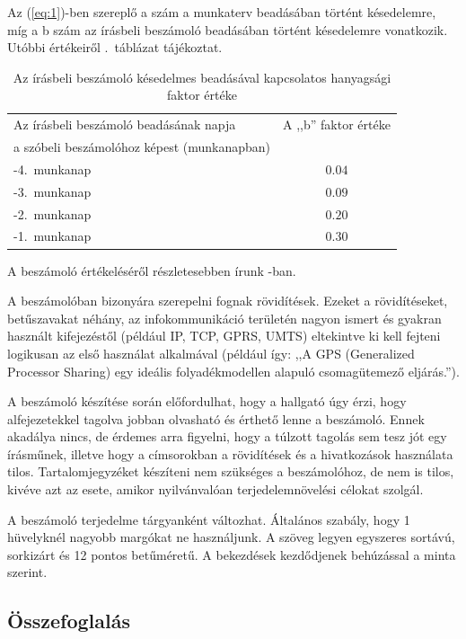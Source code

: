 \documentclass[a4paper,oneside]{article}
\begin{document}
Az (\ref{eq:1})-ben szereplő a szám a munkaterv beadásában történt
késedelemre, míg a b szám az írásbeli beszámoló beadásában történt
késedelemre vonatkozik.  Utóbbi értékeiről
.~táblázat tájékoztat.

\begin{table}
  \centering
    \begin{tabular}{|l|c|}
      \hline
      Az írásbeli beszámoló beadásának napja     & A ,,b'' faktor értéke \\
      a szóbeli beszámolóhoz képest (munkanapban) & ~ \\ \hline          
      -4.~munkanap & $0.04$ \\ \hline 
      -3.~munkanap & $0.09$ \\ \hline 
      -2.~munkanap & $0.20$ \\ \hline 
      -1.~munkanap & $0.30$ \\ \hline
      \end{tabular}
    \caption{Az írásbeli beszámoló késedelmes beadásával kapcsolatos hanyagsági faktor értéke}
  \label{tab:hanyagsagi}
\end{table}

A beszámoló értékeléséről részletesebben írunk \cite{web}-ban.

A beszámolóban bizonyára szerepelni fognak rövidítések. Ezeket a
rövidítéseket, betűszavakat néhány, az infokommunikáció területén
nagyon ismert és gyakran használt kifejezéstől (például IP, TCP, GPRS,
UMTS) eltekintve ki kell fejteni logikusan az első használat
alkalmával (például így: ,,A GPS (Generalized Processor Sharing) egy
ideális folyadékmodellen alapuló csomagütemező eljárás.'').

A beszámoló készítése során előfordulhat, hogy a hallgató úgy érzi,
hogy alfejezetekkel tagolva jobban olvasható és érthető lenne a
beszámoló.  Ennek akadálya nincs, de érdemes arra figyelni, hogy a
túlzott tagolás sem tesz jót egy írásműnek, illetve hogy a címsorokban
a rövidítések és a hivatkozások használata tilos.  Tartalomjegyzéket
készíteni nem szükséges a beszámolóhoz, de nem is tilos, kivéve azt az
esete, amikor nyilvánvalóan terjedelemnövelési célokat szolgál.

A beszámoló terjedelme tárgyanként változhat.  Általános szabály, hogy
1 hüvelyknél nagyobb margókat ne használjunk.  A szöveg legyen
egyszeres sortávú, sorkizárt és 12 pontos betűméretű.  A bekezdések
kezdődjenek behúzással a minta szerint.

\subsection{Összefoglalás}
\label{sec:osszefoglalas}
\end{document}
